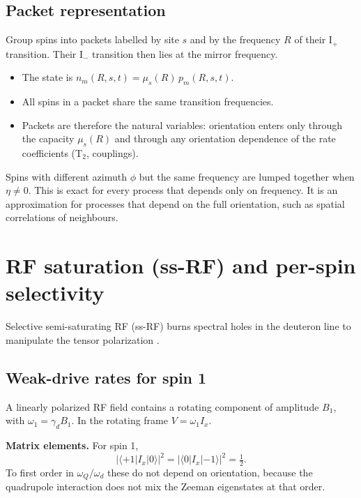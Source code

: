 \documentclass[11pt]{article}
\newcommand{\ket}[1]{\lvert #1\rangle}
\newcommand{\bra}[1]{\langle #1\rvert}
\begin{document}
\subsection{Packet representation}
\label{sec:packets}
Group spins into packets labelled by site $s$ and by the frequency $R$ of their I$_+$
transition. Their I$_-$ transition then lies at the mirror frequency.

\begin{itemize}
\item The state is $n_m(R,s,t)=\mu_s(R)\,p_m(R,s,t)$.
\item All spins in a packet share the same transition frequencies.
\item Packets are therefore the natural variables: orientation enters only through the
capacity $\mu_s(R)$ and through any orientation dependence of the rate coefficients (T$_2$,
couplings).
\end{itemize}

Spins with different azimuth $\phi$ but the same frequency are lumped together when
$\eta\neq0$. This is exact for every process that depends only on frequency. It is an
approximation for processes that depend on the full orientation, such as spatial correlations
of neighbours.

\section{RF saturation (ss-RF) and per-spin selectivity}
\label{sec:rf}

Selective semi-saturating RF (ss-RF) burns spectral holes in the deuteron line to manipulate
the tensor polarization \cite{KellerSSRF,Keller2017}.

\subsection{Weak-drive rates for spin 1}
A linearly polarized RF field contains a rotating component of amplitude $B_1$, with
$\omega_1=\gamma_dB_1$. In the rotating frame $V=\omega_1 I_x$.

\textbf{Matrix elements.} For spin 1,
\[
|\bra{+1}I_x\ket{0}|^2=|\bra{0}I_x\ket{-1}|^2=\tfrac12 .
\]
To first order in $\omega_Q/\omega_d$ these do not depend on orientation, because the
quadrupole interaction does not mix the Zeeman eigenstates at that order.
\end{document}
